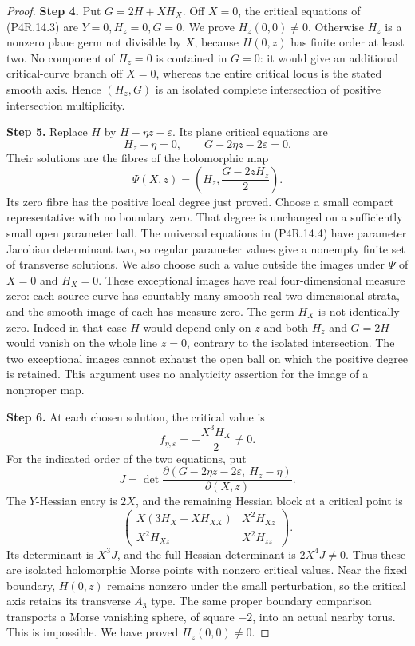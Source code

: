 \begin{proof}
\noindent\textbf{Step 4.} Put $G=2H+XH_X$. Off $X=0$, the critical equations of
(P4R.14.3) are $Y=0,H_z=0,G=0$. We prove $H_z(0,0)\ne0$.
Otherwise $H_z$ is a nonzero plane germ not divisible by
$X$, because $H(0,z)$ has finite order at least two.
No component of $H_z=0$ is contained in $G=0$: it would
give an additional critical-curve branch off $X=0$, whereas
the entire critical locus is the stated smooth axis. Hence
$(H_z,G)$ is an isolated complete intersection of positive
intersection multiplicity.

\noindent\textbf{Step 5.} Replace $H$ by $H-\eta z-\varepsilon$. Its plane critical
equations are
\[
 H_z-\eta=0,\qquad G-2\eta z-2\varepsilon=0.              \tag{P4R.14.4}
\]
Their solutions are the fibres of the holomorphic map
\[
 \Psi(X,z)=\left(H_z,\frac{G-2zH_z}{2}\right).
\]
Its zero fibre has the positive local degree just proved.
Choose a small compact representative with no boundary zero.
That degree is unchanged on a sufficiently small open
parameter ball. The universal equations in (P4R.14.4) have
parameter Jacobian determinant two, so regular parameter
values give a nonempty finite set of transverse solutions.
We also choose such a value outside the images under $\Psi$
of $X=0$ and $H_X=0$. These exceptional images have real
four-dimensional measure zero: each source curve has
countably many smooth real two-dimensional strata, and the
smooth image of each has measure zero. The germ $H_X$ is
not identically zero. Indeed in that case $H$ would depend
only on $z$ and both $H_z$ and $G=2H$ would vanish on the
whole line $z=0$, contrary to the isolated intersection.
The two exceptional images cannot exhaust the open ball
on which the positive degree is retained. This argument
uses no analyticity assertion for the image of a nonproper
map.

\noindent\textbf{Step 6.} At each chosen solution, the critical value is
\[
 f_{\eta,\varepsilon}=-\frac{X^3H_X}{2}\ne0.              \tag{P4R.14.5}
\]
For the indicated order of the two equations, put
\[
 J=\det\frac{\partial(G-2\eta z-2\varepsilon,\ H_z-\eta)}
                  {\partial(X,z)}.
\]
The $Y$-Hessian entry is $2X$, and the remaining Hessian
block at a critical point is
\[
 \begin{pmatrix}
 X(3H_X+XH_{XX})&X^2H_{Xz}\\
 X^2H_{Xz}&X^2H_{zz}
 \end{pmatrix}.
\]
Its determinant is $X^3J$, and the full Hessian determinant
is $2X^4J\ne0$. Thus these are isolated holomorphic Morse
points with nonzero critical values. Near the fixed boundary,
$H(0,z)$ remains nonzero under the small perturbation, so the
critical axis retains its transverse $A_3$ type. The same
proper boundary comparison transports a Morse vanishing
sphere, of square $-2$, into an actual nearby torus. This is
impossible. We have proved $H_z(0,0)\ne0$.


\end{proof}
